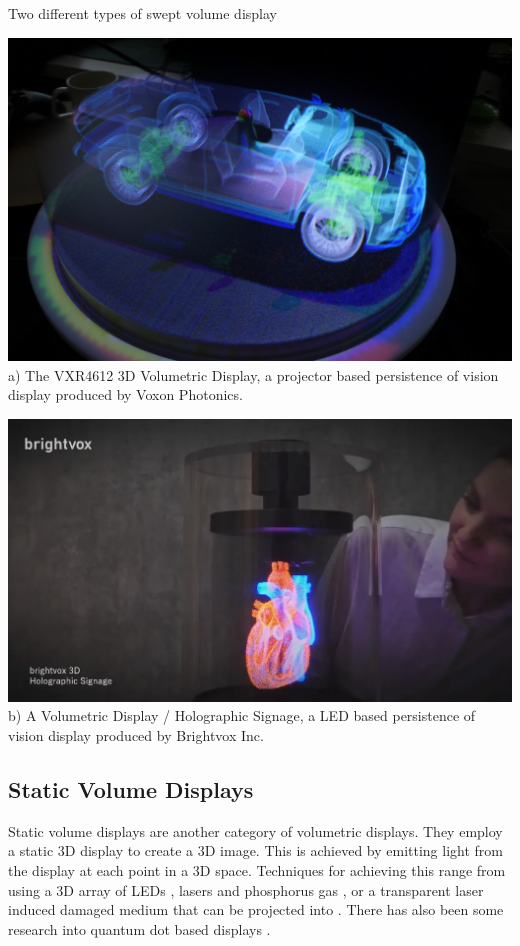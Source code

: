 \begin{figureBox}[label={fig:swept-volume-displays}]{Two different types of swept volume display}
  \begin{minipage}[t]{0.48\textwidth}
    \includegraphics[width=\textwidth]{./background/figures/3d/voxon.jpg}
    \small {a) The VXR4612 3D Volumetric Display, a projector based persistence of vision display produced by Voxon Photonics. \cite{voxon2}}
  \end{minipage}\hfill
  \begin{minipage}[t]{0.48\textwidth}
    \includegraphics[width=\textwidth]{./background/figures/3d/brightvox.png}
    \small {b) A Volumetric Display / Holographic Signage, a LED based persistence of vision display produced by Brightvox Inc. \cite{brightvox_2023}}
  \end{minipage}
\end{figureBox}

\subsection{Static Volume Displays}
Static volume displays are another category of volumetric displays. They employ a static 3D display to create a 3D image. This is achieved by emitting light from the display at each point in a 3D space. Techniques for achieving this range from using a 3D array of LEDs \cite{10.1145/2341931.2341937}, lasers and phosphorus gas \cite{https://doi.org/10.1002/anie.202003160}, or a transparent laser induced damaged medium that can be projected into \cite{10.1145/1179849.1179982}. There has also been some research into quantum dot based displays \cite{Hirayama2015}.

